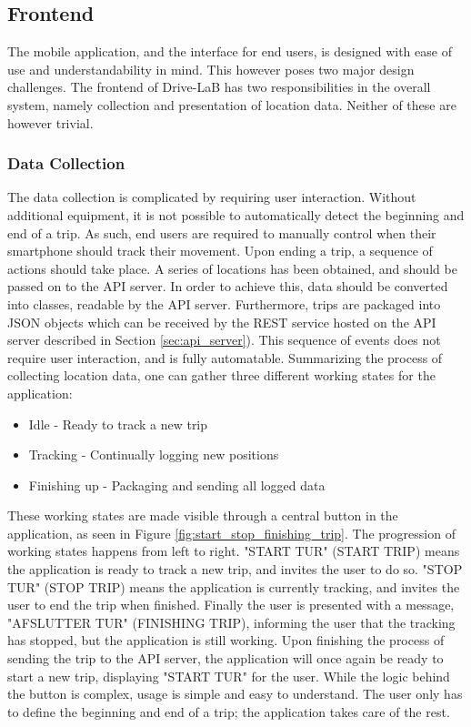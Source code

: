 \subsection{Frontend}\label{subsec:frontend_design}
The mobile application, and the interface for end users, is designed with ease of use and understandability in mind. This however poses two major design challenges. The frontend of Drive-LaB has two responsibilities in the overall system, namely collection and presentation of location data. Neither of these are however trivial.

\subsubsection{Data Collection}\label{subsubsec:design_datacollection}
The data collection is complicated by requiring user interaction. Without additional equipment, it is not possible to automatically detect the beginning and end of a trip. As such, end users are required to manually control when their smartphone should track their movement. Upon ending a trip, a sequence of actions should take place. A series of locations has been obtained, and should be passed on to the API server. In order to achieve this, data should be converted into classes, readable by the API server. Furthermore, trips are packaged into JSON objects which can be received by the REST service hosted on the API server described in Section \ref{sec:api_server}). This sequence of events does not require user interaction, and is fully automatable. Summarizing the process of collecting location data, one can gather three different working states for the application:

\begin{itemize}
\item Idle - Ready to track a new trip
\item Tracking - Continually logging new positions
\item Finishing up - Packaging and sending all logged data
\end{itemize}

These working states are made visible through a central button in the application, as seen in Figure \ref{fig:start_stop_finishing_trip}. The progression of working states happens from left to right. "START TUR" (START TRIP) means the application is ready to track a new trip, and invites the user to do so. "STOP TUR" (STOP TRIP) means the application is currently tracking, and invites the user to end the trip when finished. Finally the user is presented with a message, "AFSLUTTER TUR" (FINISHING TRIP), informing the user that the tracking has stopped, but the application is still working. Upon finishing the process of sending the trip to the API server, the application will once again be ready to start a new trip, displaying "START TUR" for the user.
While the logic behind the button is complex, usage is simple and easy to understand. The user only has to define the beginning and end of a trip; the application takes care of the rest.

